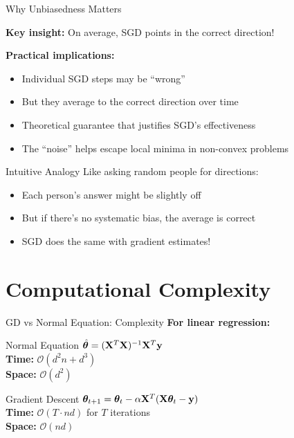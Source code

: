 \documentclass[usenames,dvipsnames]{beamer}
\begin{document}
  \begin{frame}{Why Unbiasedness Matters}
    \begin{keypointsbox}{}
    \textbf{Key insight:} On average, SGD points in the correct direction!
    \end{keypointsbox}
    
    \pause
    \textbf{Practical implications:}
    \begin{itemize}[<+->]
        \item Individual SGD steps may be ``wrong''
        \item But they average to the correct direction over time
        \item Theoretical guarantee that justifies SGD's effectiveness
        \item The ``noise'' helps escape local minima in non-convex problems
    \end{itemize}
    
    \pause
    \begin{examplebox}{Intuitive Analogy}
    Like asking random people for directions:
    \begin{itemize}
        \item Each person's answer might be slightly off
        \item But if there's no systematic bias, the average is correct
        \item SGD does the same with gradient estimates!
    \end{itemize}
    \end{examplebox}
  \end{frame}

  \section{Computational Complexity}

  \begin{frame}{GD vs Normal Equation: Complexity}
    \textbf{For linear regression:}
    
    \begin{alertbox}{Normal Equation}
    $\hat{\boldsymbol{\theta}} = (\mathbf{X}^T\mathbf{X})^{-1}\mathbf{X}^T\mathbf{y}$
    \\\textbf{Time:} $\mathcal{O}(d^2n + d^3)$
    \\\textbf{Space:} $\mathcal{O}(d^2)$ 
    \end{alertbox}
    
    \pause
    \begin{keypointsbox}{Gradient Descent}  
    $\boldsymbol{\theta}_{t+1} = \boldsymbol{\theta}_t - \alpha \mathbf{X}^T(\mathbf{X}\boldsymbol{\theta}_t - \mathbf{y})$
    \\\textbf{Time:} $\mathcal{O}(T \cdot nd)$ for $T$ iterations
    \\\textbf{Space:} $\mathcal{O}(nd)$
    \end{keypointsbox}
  \end{frame}
\end{document}
